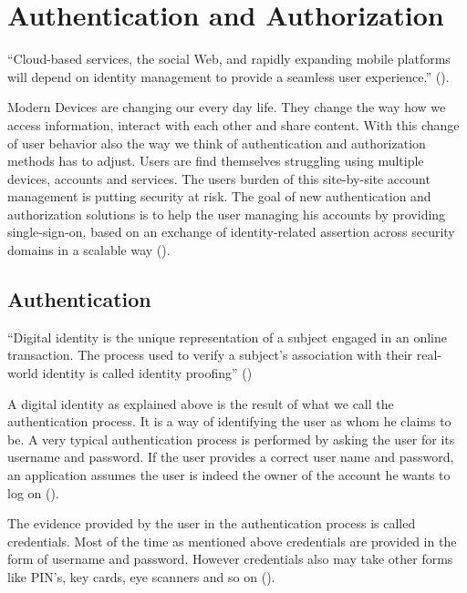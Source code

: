 \chapter{Authentication and Authorization}\label{chap:authenticationandauthorization}

\chapterstart

“Cloud-based services, the social Web, and rapidly expanding mobile platforms will depend on identity management to provide a seamless user experience.”   (\citet{Corre:2017:WHI}).

Modern Devices are changing our every day life. They change the way how we access information, interact with each other and share content. 
With this change of user behavior also the way we think of authentication and authorization methods has to adjust. Users are find themselves struggling using multiple devices, accounts and services. The users burden of this site-by-site account management is putting security at risk. The goal of new authentication and authorization solutions is to help the user managing his accounts by providing single-sign-on, based on an exchange of identity-related assertion across security domains in a scalable way (\citet{Corre:2017:WHI}).  

\section{Authentication}

“Digital identity is the unique representation of a subject engaged in an online transaction. The process used to verify a subject’s association with their real-world identity is called identity proofing” (\citet{NIST:2017:DIG})

A digital identity as explained above is the result of what we call the authentication process. It is a way of identifying the user as whom he claims to be. A very typical authentication process is performed by asking the user for its username and password. If the user provides a correct user name and password, an application assumes the user is indeed the owner of the account he wants to log on (\citet{Boyed:2012:GSOA}). 

The evidence provided by the user in the authentication process is called credentials. Most of the time as mentioned above credentials are provided in the form of username and password. However credentials also may take other forms like PIN’s, key cards, eye scanners and so on (\citet{Todorov:2007:MUI}). 

